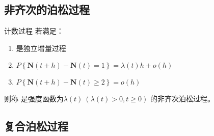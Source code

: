     \subsection{非齐次的泊松过程}
        \begin{definition}[齐次泊松过程]
            计数过程 \CountingProcess 若满足：
            \begin{enumerate}[label=(\arabic*).]
                \item \CountingProcess 是独立增量过程
                \item $P\left\{ \textbf{N}(t + h) - \textbf{N}(t) = 1 \right\} = \lambda(t) h + o(h)$
                \item $P\left\{ \textbf{N}(t + h) - \textbf{N}(t) \geq 2 \right\} = o(h)$
            \end{enumerate}
            则称 \CountingProcess 是强度函数为$\lambda(t)\ (\lambda(t) > 0, t \geq 0)$ 的非齐次泊松过程。
        \end{definition}
    \subsection{复合泊松过程}
    